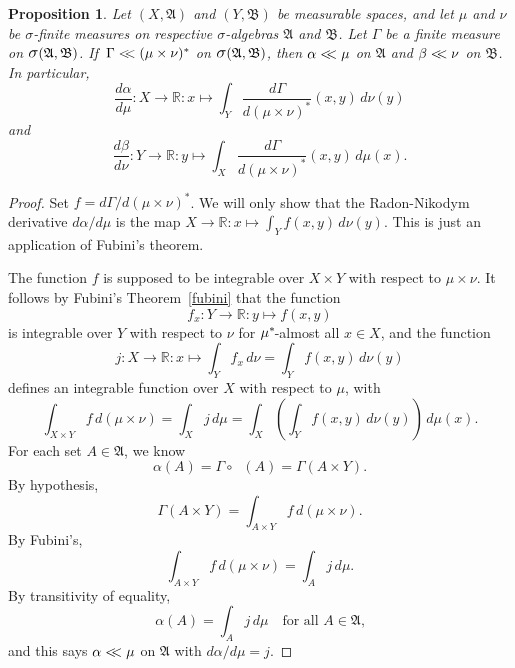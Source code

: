 \documentclass[
twoside=true,
paper=letter,
fontsize=9pt,
pagesize=auto,
leqno,
openany,
headsepline,
overfullrule,
]{scrbook}
\theoremstyle{plain}
\theoremstyle{plain}
\newtheorem{prop}[thm]{Proposition}
\theoremstyle{definition}
\theoremstyle{bfnoteitalic}
\theoremstyle{bfnoteroman}
\newcommand{\sigalg}[1]{\mathfrak{#1}}
\newcommand{\sagb}{\mathop{\hbox{\large{$\sigma$}}}\nolimits}
\newcommand{\textsigma}{\hbox{\large{$\sigma$}}\kern-1pt}
\newcommand{\preimage}[1]{\mathop{#1^{\leftarrow}}}
\newcommand{\R}{\mathbb{R}}
\newcommand{\sigmaalgebra}{\sigalg{A}}
\newcommand{\sigmaalgebraii}{\sigalg{B}}
\newcommand{\productsig}[2]{\sagb(#1,#2)}
\newcommand{\kernast}{\ast\kern-1pt}
\newcommand{\funcj}{j}
\newcommand{\function}{f}
\newcommand{\measurespace}{X}
\newcommand{\measurespaceii}{Y}
\newcommand{\mspaceelt}{x}
\newcommand{\mspaceeltii}{y}
\newcommand{\abscont}{\mathrel{< \kern-3.5pt <}}
\newcommand{\measure}{\mu}
\newcommand{\measmu}{\mu}
\newcommand{\measureii}{\nu}
\newcommand{\measnu}{\nu}
\newcommand{\seti}{A}
\newcommand{\projectionone}{\pi_1}
\newcommand{\pspace}{\measurespace}%
\newcommand{\sspace}{\measurespaceii}%
\newcommand{\joint}{\Gamma}%
\newcommand{\measonprod}{\Gamma}%
\newcommand{\marginalone}{\alpha}%
\newcommand{\marginaltwo}{\beta}%
\begin{document}
\begin{prop}\label{marginal_abscont}
Let 
$(\measurespace, \sigmaalgebra)$
and
$(\measurespaceii, \sigmaalgebraii)$
be measurable spaces, and let $\measure$ and $\measureii$
be \textsigma-finite measures on respective \textsigma-algebras 
$\sigmaalgebra$ and $\sigmaalgebraii$.
Let $\measonprod$ be a finite measure on 
$\productsig{\sigmaalgebra}{\sigmaalgebraii}$. 
If $\,\measonprod \abscont (\measure\times\measureii)^*$ on
$\productsig{\sigmaalgebra}{\sigmaalgebraii}$, 
then 
$\marginalone\abscont\measure$
on $\sigmaalgebra$
and
$\marginaltwo\abscont\measureii$
on $\sigmaalgebraii$.
In particular,
\[
\frac{d \marginalone}
{d\measure}
: \measurespace\to\R :
\mspaceelt\mapsto
\int_{\measurespaceii}
\frac{d\joint}{d(\measmu\times\measnu)^*}
(\mspaceelt,\mspaceeltii)
\,d\measureii(\mspaceeltii)
\]
and
\[
\frac{d \marginaltwo}
{d\measureii}
: \measurespaceii\to\R :
\mspaceeltii\mapsto
\int_{\measurespace}
\frac{d\joint}{d(\measmu\times\measnu)^*}
(\mspaceelt,\mspaceeltii)\,d\measure(\mspaceelt).
\]
\end{prop}


\begin{proof}
Set
$\function = d\measonprod / d(\measure\times\measureii)^*$.
We will only show that the Radon-Nikodym derivative
$d \marginalone / d \measure$
is the map
$\measurespace\to\R:
\mspaceelt\mapsto
\int_{\measurespaceii}\function(\mspaceelt,\mspaceeltii)\,d\measureii(\mspaceeltii)$.
This is just an application of Fubini's theorem.

The function $\function$ is supposed to be integrable over $\pspace\times\sspace$ with respect to 
$\measure\times\measureii$. It follows by
Fubini's Theorem~\ref{fubini} that
the function
\[
\function_\mspaceelt : 
\measurespaceii \to\R
: \mspaceeltii \mapsto \function(\mspaceelt,\mspaceeltii)
\]
is integrable over $\measurespaceii$ with respect to $\measureii$
 for
$\measure^\kernast$-almost all 
$\mspaceelt\in\measurespace$, 
and the function
\[
\funcj :\measurespace\to\R :\mspaceelt\mapsto
\int_\measurespaceii\function_\mspaceelt\,d\measureii
=
\int_{\measurespaceii}\function(\mspaceelt,\mspaceeltii) \, d\measureii(\mspaceeltii)
\]
defines an integrable function over $\measurespace$ with respect to 
$\measure$, with
\[
\int_{\measurespace\times\measurespaceii} 
\function \, d (\measure\times\measureii)
=
\int_\measurespace \funcj \,d \measure
=
\int_\measurespace
\left(
\int_\measurespaceii
\function(\mspaceelt,\mspaceeltii) 
\, d\measureii(\mspaceeltii)
\right) \, d\measure(\mspaceelt).
\]
For each set $\seti\in\sigmaalgebra$,
we know 
\[
\marginalone(\seti) 
= \measonprod\circ\preimage{\projectionone}(\seti)
= \measonprod(\seti\times\measurespaceii).
\]
By hypothesis, 
\[
\measonprod(\seti\times\measurespaceii)
=
\int_{\seti\times\measurespaceii} \function \, d(\measure\times\measureii).
\]
By Fubini's,
\[
\int_{\seti\times\measurespaceii} \function 
\, d(\measure\times\measureii)
= \int_{\seti} \funcj \,d\measure.
\]
By transitivity of equality, 
\[
\marginalone(\seti)
=
\int_{\seti} \funcj \,d\measure
\quad
\text{for all $\seti\in\sigmaalgebra$,}
\]
and this says $\marginalone\abscont \measure$
on $\sigmaalgebra$ with
$d\marginalone/d\measure = \funcj$.
\end{proof}
\end{document}
